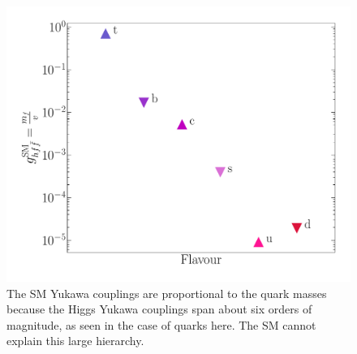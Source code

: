 \begin{figure}[htpb!]
	\centering
	\includegraphics[width=0.5\linewidth]{./figures/yukawa}
	\caption{The SM Yukawa couplings are proportional to the quark masses because the Higgs Yukawa couplings span about six orders of magnitude, as seen in the case of quarks here. The SM cannot explain this large hierarchy. } 
	\label{fig:SMYuk}
\end{figure}
